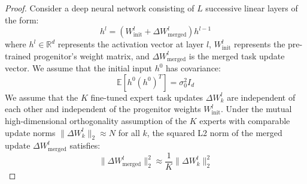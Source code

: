 \documentclass{article}
\theoremstyle{plain}
\theoremstyle{definition}
\theoremstyle{remark}
\begin{document}
\begin{proof}
Consider a deep neural network consisting of $L$ successive linear layers of the form:
\begin{equation}
h^l = \left(W_{\text{init}}^l + \Delta W_{\text{merged}}^l\right) h^{l-1}
\end{equation}
where $h^l \in \mathbb{R}^d$ represents the activation vector at layer $l$, $W_{\text{init}}^l$ represents the pre-trained progenitor's weight matrix, and $\Delta W_{\text{merged}}^l$ is the merged task update vector. We assume that the initial input $h^0$ has covariance:
\begin{equation}
\mathbb{E}[h^0 (h^0)^T] = \sigma_0^2 I_d
\end{equation}
We assume that the $K$ fine-tuned expert task updates $\Delta W^l_k$ are independent of each other and independent of the progenitor weights $W_{\text{init}}^l$. Under the mutual high-dimensional orthogonality assumption of the $K$ experts with comparable update norms $\|\Delta W^l_k\|_2 \approx N$ for all $k$, the squared L2 norm of the merged update $\Delta W_{\text{merged}}^l$ satisfies:
\begin{equation}
\|\Delta W_{\text{merged}}^l\|_2^2 \approx \frac{1}{K} \|\Delta W_k^l\|_2^2
\end{equation}


\end{proof}
\end{document}

